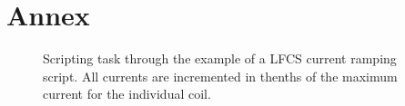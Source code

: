 

\appendix

{}	%
{}	%


\section{Annex}
		\label{appendix}
		
\setcounter{figure}{0}


\begin{figure}[p]
    \vspace*{-2cm}
    \caption[ORCA script LFCS coils]{Scripting task through the example of a LFCS current ramping script. All currents are incremented in thenths of the maximum current for the individual coil. }
  \label{fig:ORCA:script}
\end{figure}

